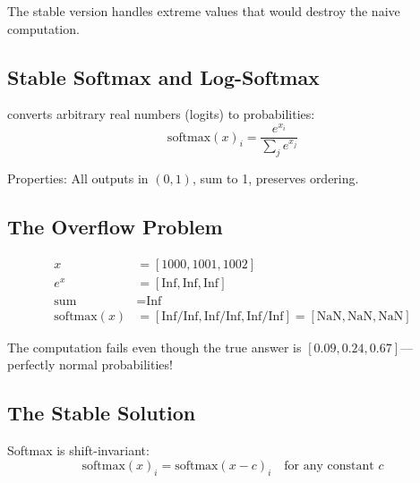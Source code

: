 The stable version handles extreme values that would destroy the naive computation.




\subsection{Stable Softmax and Log-Softmax}

 converts arbitrary real numbers (logits) to probabilities:
\begin{equation}
    \text{softmax}(x)_i = \frac{e^{x_i}}{\sum_j e^{x_j}}
\end{equation}

Properties: All outputs in $(0, 1)$, sum to 1, preserves ordering.


\subsection{The Overflow Problem}

\begin{align*}
    x &= [1000, 1001, 1002] \\
    e^{x} &= [\text{Inf}, \text{Inf}, \text{Inf}] \\
    \text{sum} &= \text{Inf} \\
    \text{softmax}(x) &= [\text{Inf}/\text{Inf}, \text{Inf}/\text{Inf}, \text{Inf}/\text{Inf}] = [\text{NaN}, \text{NaN}, \text{NaN}]
\end{align*}

The computation fails even though the true answer is $[0.09, 0.24, 0.67]$---perfectly normal probabilities!


\subsection{The Stable Solution}

 Softmax is shift-invariant:
\begin{equation}
    \text{softmax}(x)_i = \text{softmax}(x - c)_i \quad \text{for any constant } c
\end{equation}

